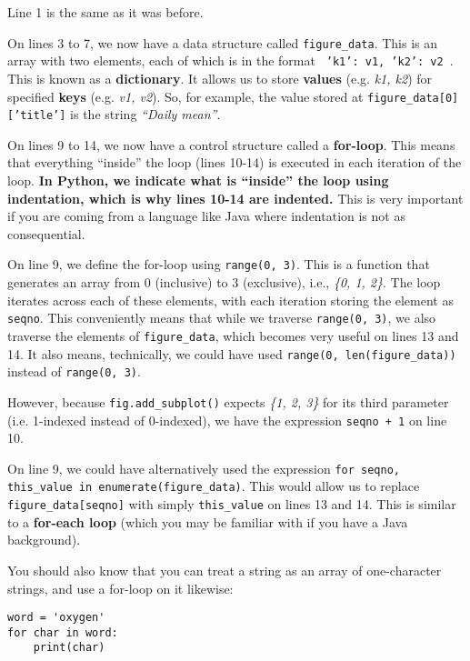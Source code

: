\begin{multicols*}{2}
\begin{myitemize}
    \item Line 1 is the same as it was before.
    \item On lines 3 to 7, we now have a data structure called \texttt{figure_data}. This is an array with two elements, each of which is in the format \texttt{{ 'k1': v1, 'k2': v2 }}. This is known as a \textbf{dictionary}. It allows us to store \textbf{values} (e.g. \textit{k1, k2}) for specified \textbf{keys} (e.g. \textit{v1, v2}). So, for example, the value stored at \texttt{figure_data[0]['title']} is the string \textit{``Daily mean''}.
    \item On lines 9 to 14, we now have a control structure called a \textbf{for-loop}. This means that everything ``inside'' the loop (lines 10-14) is executed in each iteration of the loop. \textbf{In Python, we indicate what is ``inside'' the loop using indentation, which is why lines 10-14 are indented.} This is very important if you are coming from a language like Java where indentation is not as consequential.
    \item On line 9, we define the for-loop using \texttt{range(0, 3)}. This is a function that generates an array from 0 (inclusive) to 3 (exclusive), i.e., \textit{\{0, 1, 2\}}. The loop iterates across each of these elements, with each iteration storing the element as \texttt{seqno}. This conveniently means that while we traverse \texttt{range(0, 3)}, we also traverse the elements of \texttt{figure_data}, which becomes very useful on lines 13 and 14. It also means, technically, we could have used \texttt{range(0, len(figure_data))} instead of \texttt{range(0, 3)}.
    \item However, because \texttt{fig.add_subplot()} expects \textit{\{1, 2, 3\}} for its third parameter (i.e. 1-indexed instead of 0-indexed), we have the expression \texttt{seqno + 1} on line 10.
    \item On line 9, we could have alternatively used the expression \texttt{for seqno, this_value in enumerate(figure_data)}. This would allow us to replace \texttt{figure_data[seqno]} with simply \texttt{this_value} on lines 13 and 14. This is similar to a \textbf{for-each loop} (which you may be familiar with if you have a Java background).
\end{myitemize}

You should also know that you can treat a string as an array of one-character strings, and use a for-loop on it likewise:

\vspace{-4mm}
\begin{verbatim}
word = 'oxygen'
for char in word:
    print(char)
\end{verbatim}

\end{multicols*}
